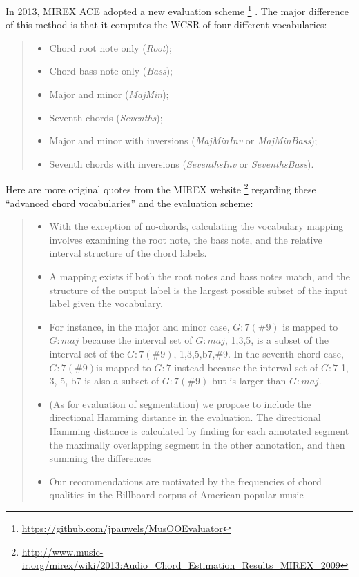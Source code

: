 In 2013, MIREX ACE adopted a new evaluation scheme \footnote{\url{https://github.com/jpauwels/MusOOEvaluator}} \cite{pauwels2013evaluating}. The major difference of this method is that it computes the WCSR of four different vocabularies:
\begin{quote}
\begin{itemize}
\item Chord root note only ({\it Root});
\item Chord bass note only ({\it Bass});
\item Major and minor ({\it MajMin});
\item Seventh chords ({\it Sevenths});
\item Major and minor with inversions ({\it MajMinInv} or {\it MajMinBass});
\item Seventh chords with inversions ({\it SeventhsInv} or {\it SeventhsBass}).
\end{itemize}
\end{quote}
Here are more original quotes from the MIREX website \footnote{\url{http://www.music-ir.org/mirex/wiki/2013:Audio\_Chord\_Estimation\_Results\_MIREX\_2009}} regarding these ``advanced chord vocabularies'' and the evaluation scheme:
\begin{quote}
\begin{itemize}
\item With the exception of no-chords, calculating the vocabulary mapping involves examining the root note, the bass note, and the relative interval structure of the chord labels.
\item A mapping exists if both the root notes and bass notes match, and the structure of the output label is the largest possible subset of the input label given the vocabulary.
\item For instance, in the major and minor case, $G:7(\#9)$ is mapped to $G:maj$ because the interval set of $G:maj$, {1,3,5}, is a subset of the interval set of the $G:7(\#9)$, {1,3,5,b7,\#9}. In the seventh-chord case, $G:7(\#9)$is mapped to $G:7$ instead because the interval set of $G:7$ {1, 3, 5, b7} is also a subset of $G:7(\#9)$ but is larger than $G:maj$.
\item (As for evaluation of segmentation) we propose to include the directional Hamming distance in the evaluation. The directional Hamming distance is calculated by finding for each annotated segment the maximally overlapping segment in the other annotation, and then summing the differences \cite{abdallah2005theory,mauch2010automatic}
\item Our recommendations are motivated by the frequencies of chord qualities in the Billboard corpus of American popular music \cite{burgoyne2011expert}
\end{itemize}
\end{quote}

